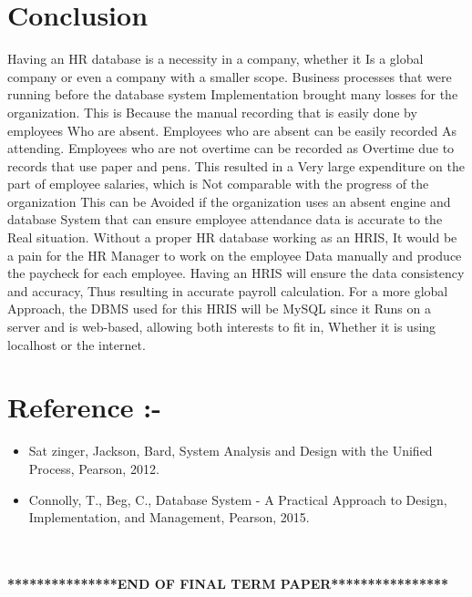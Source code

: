 \documentclass[12pt,a4paper]{article}
\begin{document}
\section*{Conclusion}Having an HR database is a necessity in a company, whether it Is a global company or even a company with a smaller scope. Business processes that were running before the database system Implementation brought many losses for the organization. This is Because the manual recording that is easily done by employees Who are absent. Employees who are absent can be easily recorded
As attending. Employees who are not overtime can be recorded as Overtime due to records that use paper and pens. This resulted in a Very large expenditure on the part of employee salaries, which is Not comparable with the progress of the organization This can be Avoided if the organization uses an absent engine and database System that can ensure employee attendance data is accurate to the Real situation.
Without a proper HR database working as an HRIS, It would be a pain for the HR Manager to work on the employee Data manually and produce the paycheck for each employee. Having an HRIS will ensure the data consistency and accuracy,
Thus resulting in accurate payroll calculation. For a more global Approach, the DBMS used for this HRIS will be MySQL since it Runs on a server and is web-based, allowing both interests to fit in, Whether it is using localhost or the internet.
\section*{Reference :-}
\begin{itemize}
    \item 	Sat zinger, Jackson, Bard, System Analysis and Design with the Unified Process, Pearson, 2012.
\item 	Connolly, T., Beg, C., Database System - A Practical Approach to Design, Implementation, and Management, Pearson, 2015.
\end{itemize}
\\
\\
\textbf{***************END OF FINAL TERM PAPER****************}
\end{document}
